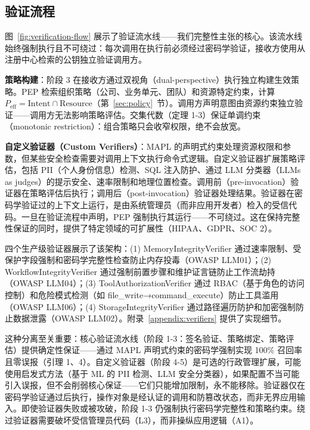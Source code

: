 \subsection{验证流程}

图~\ref{fig:verification-flow} 展示了验证流水线——我们完整性主张的核心。该流水线始终强制执行且不可绕过：每次调用在执行前必须经过密码学验证，接收方使用从注册中心检索的公钥独立验证调用方。

\textbf{策略构建}：阶段 3 在接收方通过双视角（dual-perspective）执行独立构建生效策略。PEP 检索组织策略（公司、业务单元、团队）和资源特定约束，计算 $P_{\text{eff}} = \text{Intent} \cap \text{Resource}$（第~\ref{sec:policy}~节）。调用方声明意图由资源约束独立验证——调用方无法影响策略评估。交集代数（定理 1-3）保证单调约束（monotonic restriction）：组合策略只会收窄权限，绝不会放宽。

\textbf{自定义验证器（Custom Verifiers）}：MAPL 的声明式约束处理资源权限和参数，但某些安全检查需要对调用上下文执行命令式逻辑。自定义验证器扩展策略评估，包括 PII（个人身份信息）检测、SQL 注入防护、通过 LLM 分类器（LLMs as judges）的提示安全、速率限制和地理位置检查。调用前（pre-invocation）验证器在策略评估后执行；调用后（post-invocation）验证器处理结果。验证器在密码学验证过的上下文上运行，是由系统管理员（而非应用开发者）检入的受信代码。一旦在验证流程中声明，PEP 强制执行其运行——不可绕过。这在保持完整性保证的同时，提供了特定领域的可扩展性（HIPAA、GDPR、SOC 2）。

四个生产级验证器展示了该架构：(1) MemoryIntegrityVerifier 通过速率限制、受保护字段强制和密码学完整性检查防止内存投毒（OWASP LLM01）；(2) WorkflowIntegrityVerifier 通过强制前置步骤和维护证言链防止工作流劫持（OWASP LLM04）；(3) ToolAuthorizationVerifier 通过 RBAC（基于角色的访问控制）和危险模式检测（如 file\_write→command\_execute）防止工具滥用（OWASP LLM06）；(4) StorageIntegrityVerifier 通过路径遍历防护和加密强制防止数据泄露（OWASP LLM02）。附录~\ref{appendix:verifiers} 提供了实现细节。

这种分离至关重要：核心验证流水线（阶段 1-3：签名验证、策略绑定、策略评估）提供确定性保证——通过 MAPL 声明式约束的密码学强制实现 100\% 召回率且零误报（引理 1、4）。自定义验证器（阶段 4-5）是可选的行政管理扩展，可能使用启发式方法（基于 ML 的 PII 检测、LLM 安全分类器），如果配置不当可能引入误报，但不会削弱核心保证——它们只能增加限制，永不能移除。验证器仅在密码学验证通过后执行，操作对象是经认证的调用和防篡改状态，而非无界应用输入。即使验证器失败或被攻破，阶段 1-3 仍强制执行密码学完整性和策略约束。绕过验证器需要破坏受信管理员代码（L3），而非操纵应用逻辑（A1）。

